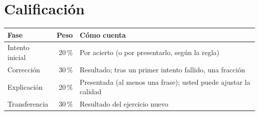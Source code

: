 \documentclass[11pt,a4paper,oneside]{book}
\begin{document}
\section{Calificación}
\begin{center}
\begin{tabular}{l r l}
\toprule
Fase & Peso & Cómo cuenta \\
\midrule
Intento inicial & 20\,\% & Por acierto (o por presentarlo, según la regla) \\
Corrección & 30\,\% & Resultado; tras un primer intento fallido, una fracción \\
Explicación & 20\,\% & Presentada (al menos una frase); usted puede ajustar la calidad \\
Transferencia & 30\,\% & Resultado del ejercicio nuevo \\
\bottomrule
\end{tabular}
\end{center}
\end{document}
